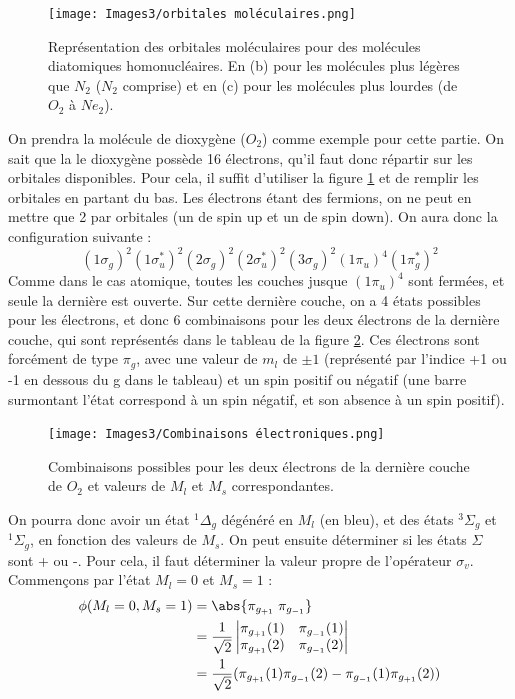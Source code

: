 \begin{figure}[ht]
    \centering
    \texttt{[image: Images3/orbitales moléculaires.png]}
    \caption{Représentation des orbitales moléculaires pour des molécules diatomiques homonucléaires. En (b) pour les molécules plus légères que $N_2$ ($N_2$ comprise) et en (c) pour les molécules plus lourdes (de $O_2$ à $Ne_2$).}
    \label{fig:orbitales}
\end{figure}
On prendra la molécule de dioxygène ($O_2$) comme exemple pour cette partie.\newline
On sait que la le dioxygène possède 16 électrons, qu'il faut donc répartir sur les orbitales disponibles. Pour cela, il suffit d'utiliser la figure \ref{fig:orbitales} et de remplir les orbitales en partant du bas. Les électrons étant des fermions, on ne peut en mettre que 2 par orbitales (un de spin up et un de spin down). On aura donc la configuration suivante : 
\begin{equation*}
    (1\sigma_g)^2(1\sigma^*_u)^2(2\sigma_g)^2(2\sigma^*_u)^2(3\sigma_g)^2(1\pi_u)^4(1\pi^*_g)^2
\end{equation*}
Comme dans le cas atomique, toutes les couches jusque $(1\pi_u)^4$ sont fermées, et seule la dernière est ouverte. Sur cette dernière couche, on a 4 états possibles pour les électrons, et donc 6 combinaisons pour les deux électrons de la dernière couche, qui sont représentés dans le tableau de la figure \ref{fig:Combinaisons}. Ces électrons sont forcément de type $\pi_g$, avec une valeur de $m_l$ de $\pm1$ (représenté par l'indice +1 ou -1 en dessous du g dans le tableau) et un spin positif ou négatif (une barre surmontant l'état correspond à un spin négatif, et son absence à un spin positif).\newline
\begin{figure}
    \centering
    \texttt{[image: Images3/Combinaisons électroniques.png]}
    \caption{Combinaisons possibles pour les deux électrons de la dernière couche de $O_2$ et valeurs de $M_l$ et $M_s$ correspondantes.}
    \label{fig:Combinaisons}
\end{figure}
On pourra donc avoir un état $^1\Delta_g$ dégénéré en $M_l$ (en bleu), et des états $^3\Sigma_g$ et $^1\Sigma_g$, en fonction des valeurs de $M_s$. On peut ensuite déterminer si les états $\Sigma$ sont + ou -. Pour cela, il faut déterminer la valeur propre de l'opérateur $\sigma_v$. Commençons par l'état $M_l = 0$ et $M_s=1$ :  
\begin{equation*}
    \begin{split}
        \phi(M_l=0, M_s=1) &= \abs{\pi_{g_{+1}}\;\pi_{g_{-1}}}\\
        &= \frac{1}{\sqrt{2}}
        \begin{vmatrix}
            \pi_{g_{+1}}(1) & \pi_{g_{-1}}(1)\\
            \pi_{g_{+1}}(2) & \pi_{g_{-1}}(2)\\
        \end{vmatrix}\\
        &= \frac{1}{\sqrt{2}}(\pi_{g_{+1}}(1)\pi_{g_{-1}}(2)-\pi_{g_{-1}}(1)\pi_{g_{+1}}(2))\\
    \end{split}
\end{equation*}
